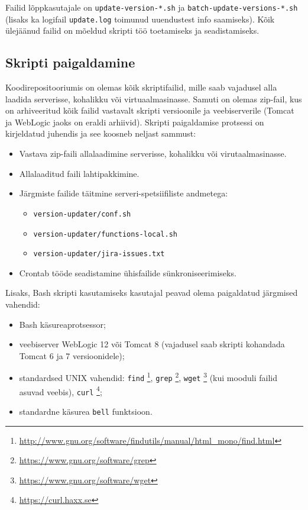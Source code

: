 \documentclass[12pt]{article}
\newcommand{\code}[1]{\texttt{#1}}
\begin{document}
   Failid lõppkasutajale on \code{update-version-*.sh} ja \code{batch-update-versions-*.sh} (lisaks ka logifail \code{update.log} toimunud uuendustest info saamiseks). Kõik ülejäänud failid on mõeldud skripti töö toetamiseks ja seadistamiseks.
   
   \newpage
      
 \subsection{Skripti paigaldamine}
  
  Koodirepositooriumis on olemas kõik skriptifailid, mille saab vajadusel alla laadida serverisse, kohalikku või virtuaalmasinasse. Samuti on olemas zip\--fail, kus on arhiveeritud kõik failid vastavalt skripti versioonile ja veebiserverile (Tomcat ja WebLogic jaoks on eraldi arhiivid). Skripti paigaldamise protsessi on kirjeldatud juhendis ja see koosneb neljast sammust:
  \begin{itemize}
    \item Vastava zip\--faili allalaadimine serverisse, kohalikku või virutaalmasinasse.
    \item Allalaaditud faili lahtipakkimine.
    \item Järgmiste failide täitmine serveri\--spetsiifiliste andmetega:
    \begin{itemize}
      \item \code{version-updater/conf.sh}
      \item \code{version-updater/functions-local.sh}
      \item \code{version-updater/jira-issues.txt}
    \end{itemize}
    \item Crontab tööde seadistamine ühisfailide sünkroniseerimiseks.
  \end{itemize}
  
  Lisaks, Bash skripti kasutamiseks kasutajal peavad olema paigaldatud järgmised vahendid:
  \begin{itemize}
    \item Bash käsureaprotsessor;
    \item veebiserver WebLogic 12 või Tomcat 8 (vajadusel saab skripti kohandada Tomcat 6 ja 7 versioonidele);
    \item standardsed UNIX vahendid: \code{find} \footnote{\url{http://www.gnu.org/software/findutils/manual/html_mono/find.html}}, \code{grep} \footnote{\url{https://www.gnu.org/software/grep}}, \code{wget} \footnote{\url{https://www.gnu.org/software/wget}} (kui mooduli failid asuvad veebis), \code{curl} \footnote{\url{https://curl.haxx.se}};
    \item standardne käsurea \code{bell} funktsioon.
  \end{itemize}
\end{document}
